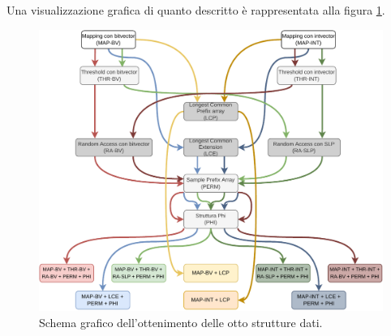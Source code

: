 Una visualizzazione grafica di quanto descritto è rappresentata alla figura
\ref{fig:compon}.
\begin{figure}
  \centering
  \includegraphics[width=\textwidth]{img/ds.pdf}
  \caption{Schema grafico dell'ottenimento delle otto strutture dati.}
  \label{fig:compon}
\end{figure}
